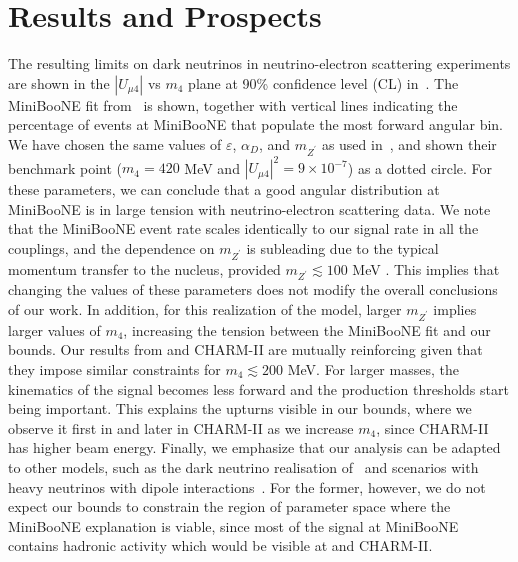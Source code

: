 \section{Results and Prospects}
The resulting limits on dark neutrinos in neutrino-electron scattering experiments are shown in the $|U_{\mu 4}|$ vs $m_4$ plane at 90\% confidence level (CL) in~. The MiniBooNE fit from~\cite{Bertuzzo:2018itn} is shown, together with vertical lines indicating the percentage of events at MiniBooNE that populate the most forward angular bin.
We have chosen the same values of $\varepsilon$, $\alpha_D$, and $m_{Z^\prime}$ as used in~\cite{Bertuzzo:2018itn}, and shown their benchmark point ($m_4 = 420$ MeV and $|U_{\mu 4}|^2 = 9 \times 10^{-7}$) as a dotted circle. For these parameters, we can conclude that a good angular distribution at MiniBooNE is in large tension with neutrino-electron scattering data.
We note that the MiniBooNE event rate scales identically to our signal rate in all the couplings, and the dependence on $m_{Z^\prime}$ is subleading due to the typical momentum transfer to the nucleus, provided $m_{Z^\prime} \lesssim 100$ MeV .
This implies that changing the values of these parameters does not modify the overall conclusions of our work. In addition, for this realization of the model, larger $m_{Z^\prime}$ implies larger values of $m_4$, increasing the tension between the MiniBooNE fit and our bounds.
Our results from \minerva and CHARM-II are mutually reinforcing given that 
they impose similar constraints for $m_4 \lesssim 200 $ MeV. For larger masses, the kinematics of the signal becomes less forward and the production thresholds start being important. This explains the upturns visible in our bounds, where we observe it first in \minerva and later in CHARM-II as we increase $m_4$, since CHARM-II has higher beam energy. Finally, we emphasize that our analysis can be adapted to other models, such as the dark neutrino realisation of~\cite{Ballett:2018ynz} and scenarios with heavy neutrinos with dipole interactions~\cite{Magill:2018jla}. For the former, however, we do not expect our bounds to constrain the region of parameter space where the MiniBooNE explanation is viable, since most of the signal at MiniBooNE contains hadronic activity which would be visible at \minerva and CHARM-II.

